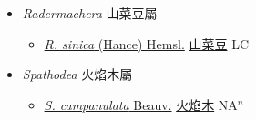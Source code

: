 
  \begin{itemize}
 \item[] \textit{Radermachera} 山菜豆屬
                    
  \begin{itemize}
        \item[] \href{http://www.theplantlist.org/tpl1.1/search?q=Radermachera+sinica}{\textit{R. sinica} (Hance) Hemsl.}   \href{\detokenize{http://taibnet.sinica.edu.tw/chi/taibnet_species_list.php?T2=山菜豆&T2_new_value=true&fr=y}}{山菜豆} LC
  \end{itemize}
 \item[] \textit{Spathodea} 火焰木屬
                    
  \begin{itemize}
        \item[] \href{http://www.theplantlist.org/tpl1.1/search?q=Spathodea+campanulata}{\textit{S. campanulata} Beauv.}   \href{\detokenize{http://taibnet.sinica.edu.tw/chi/taibnet_species_list.php?T2=火焰木&T2_new_value=true&fr=y}}{火焰木} NA$^n$
  \end{itemize}
  \end{itemize}
